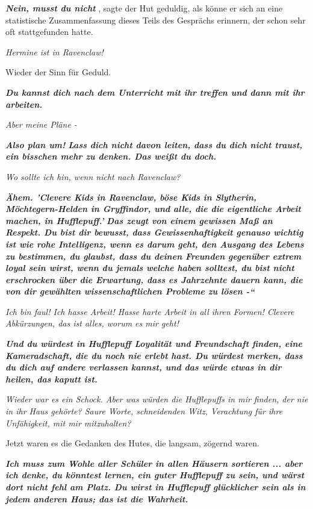 \textbf{\emph{ \glqq Nein, musst du nicht}}\grqq{} , sagte der Hut geduldig, als
könne er sich an eine statistische Zusammenfassung dieses Teils des Gesprächs
erinnern, der schon sehr oft stattgefunden hatte.

\emph{ Hermine ist in Ravenclaw! }

Wieder der Sinn für Geduld.

\textbf{\emph{ \glqq Du kannst dich nach dem Unterricht mit ihr treffen und dann
mit ihr arbeiten.\grqq{} }}

\emph{ Aber meine Pläne -}

\textbf{\emph{\glqq Also plan um!}} \textbf{\emph{ Lass dich nicht davon leiten,
dass du dich nicht traust, ein bisschen mehr zu denken. Das weißt du
doch.\grqq{} }}

\emph{ Wo sollte ich hin, wenn nicht nach Ravenclaw?}

\textbf{\emph{ \glqq Ähem. 'Clevere Kids in Ravenclaw, böse Kids in Slytherin,
Möchtegern-Helden in Gryffindor, und alle, die die eigentliche Arbeit machen, in
Hufflepuff.' }} \textbf{} \textbf{\emph{Das zeugt von einem gewissen Maß an
Respekt. Du bist dir bewusst, dass Gewissenhaftigkeit genauso wichtig ist wie
rohe Intelligenz, wenn es darum geht, den Ausgang des Lebens zu bestimmen, du
glaubst, dass du deinen Freunden gegenüber extrem loyal sein wirst, wenn du
jemals welche haben solltest, du bist nicht erschrocken über die Erwartung, dass
es Jahrzehnte dauern kann, die von dir gewählten wissenschaftlichen Probleme zu
lösen -“}}

\emph{ Ich bin faul! Ich hasse Arbeit! Hasse harte Arbeit in all ihren Formen!
Clevere Abkürzungen, das ist alles, worum es mir geht!}

\textbf{\emph{ \glqq Und du würdest in Hufflepuff Loyalität und Freundschaft
finden, eine Kameradschaft, die du noch nie erlebt hast. Du würdest merken, dass
du dich auf andere verlassen kannst, und das würde etwas in dir heilen, das
kaputt ist.\grqq{} }}

\emph{ Wieder war es ein Schock. Aber was würden die Hufflepuffs in mir finden,
der nie in ihr Haus gehörte? Saure Worte, schneidenden Witz, Verachtung für ihre
Unfähigkeit, mit mir mitzuhalten?}

Jetzt waren es die Gedanken des Hutes, die langsam, zögernd waren.

\textbf{\emph{ \glqq Ich muss zum Wohle aller Schüler in allen Häusern sortieren
... aber ich denke, du könntest lernen, ein guter Hufflepuff zu sein, und wärst
dort nicht fehl am Platz. Du wirst in Hufflepuff glücklicher sein als in jedem
anderen Haus; das ist die Wahrheit.\grqq{} }}

